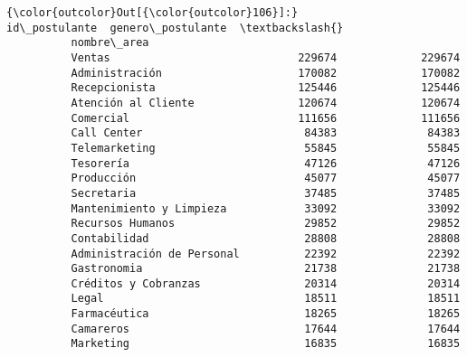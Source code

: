 \documentclass[11pt]{article}
\begin{document}
\begin{Verbatim}[commandchars=\\\{\}]
{\color{outcolor}Out[{\color{outcolor}106}]:}                             id\_postulante  genero\_postulante  \textbackslash{}
          nombre\_area                                                    
          Ventas                             229674             229674   
          Administración                     170082             170082   
          Recepcionista                      125446             125446   
          Atención al Cliente                120674             120674   
          Comercial                          111656             111656   
          Call Center                         84383              84383   
          Telemarketing                       55845              55845   
          Tesorería                           47126              47126   
          Producción                          45077              45077   
          Secretaria                          37485              37485   
          Mantenimiento y Limpieza            33092              33092   
          Recursos Humanos                    29852              29852   
          Contabilidad                        28808              28808   
          Administración de Personal          22392              22392   
          Gastronomia                         21738              21738   
          Créditos y Cobranzas                20314              20314   
          Legal                               18511              18511   
          Farmacéutica                        18265              18265   
          Camareros                           17644              17644   
          Marketing                           16835              16835   
          

\end{Verbatim}
\end{document}
